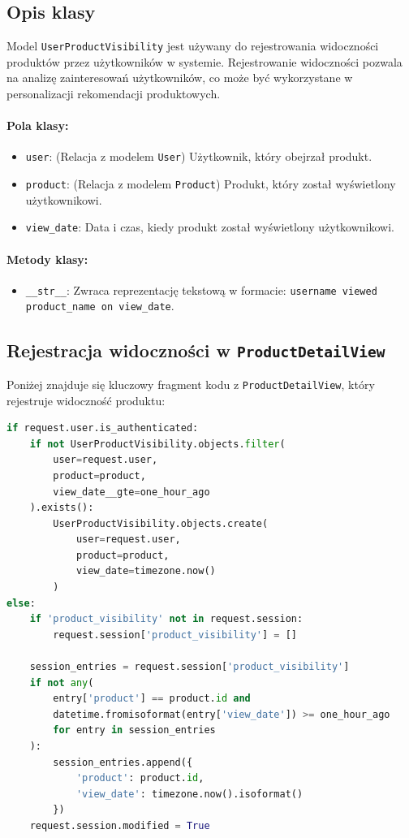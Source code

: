 \documentclass[12pt,a4paper,oneside]{article}
\theoremstyle{definition}
\numberwithin{equation}{section}
\begin{document}
\subsection{Opis klasy}
Model \texttt{UserProductVisibility} jest używany do rejestrowania widoczności produktów przez użytkowników w systemie. Rejestrowanie widoczności pozwala na analizę zainteresowań użytkowników, co może być wykorzystane w personalizacji rekomendacji produktowych.

\paragraph{Pola klasy:}
\begin{itemize}
    \item \texttt{user}: (Relacja z modelem \texttt{User}) Użytkownik, który obejrzał produkt.
    \item \texttt{product}: (Relacja z modelem \texttt{Product}) Produkt, który został wyświetlony użytkownikowi.
    \item \texttt{view\_date}: Data i czas, kiedy produkt został wyświetlony użytkownikowi.
\end{itemize}

\paragraph{Metody klasy:}
\begin{itemize}
    \item \texttt{\_\_str\_\_}: Zwraca reprezentację tekstową w formacie: \texttt{username viewed product\_name on view\_date}.
\end{itemize}

\subsection{Rejestracja widoczności w \texttt{ProductDetailView}}
Poniżej znajduje się kluczowy fragment kodu z \texttt{ProductDetailView}, który rejestruje widoczność produktu:

\begin{lstlisting}[language=Python]
if request.user.is_authenticated:
    if not UserProductVisibility.objects.filter(
        user=request.user, 
        product=product, 
        view_date__gte=one_hour_ago
    ).exists():
        UserProductVisibility.objects.create(
            user=request.user, 
            product=product, 
            view_date=timezone.now()
        )
else:
    if 'product_visibility' not in request.session:
        request.session['product_visibility'] = []

    session_entries = request.session['product_visibility']
    if not any(
        entry['product'] == product.id and 
        datetime.fromisoformat(entry['view_date']) >= one_hour_ago
        for entry in session_entries
    ):
        session_entries.append({
            'product': product.id,
            'view_date': timezone.now().isoformat()
        })
    request.session.modified = True
\end{lstlisting}
\end{document}
